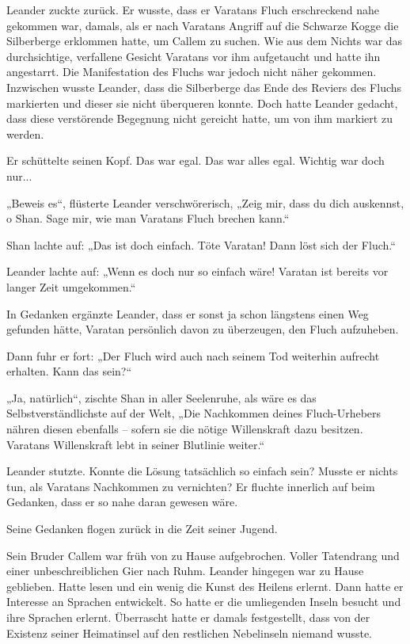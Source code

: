 \documentclass[10pt, a4paper, oneside]{book}
\begin{document}
Leander zuckte zurück. Er wusste, dass er Varatans Fluch erschreckend nahe gekommen war, damals, als er nach Varatans Angriff auf die Schwarze Kogge die Silberberge erklommen hatte, um Callem zu suchen. Wie aus dem Nichts war das durchsichtige, verfallene Gesicht Varatans vor ihm aufgetaucht und hatte ihn angestarrt. Die Manifestation des Fluchs war jedoch nicht näher gekommen. Inzwischen wusste Leander, dass die Silberberge das Ende des Reviers des Fluchs markierten und dieser sie nicht überqueren konnte. Doch hatte Leander gedacht, dass diese verstörende Begegnung nicht gereicht hatte, um von ihm markiert zu werden.

Er schüttelte seinen Kopf. Das war egal. Das war alles egal. Wichtig war doch nur...

„Beweis es“, flüsterte Leander verschwörerisch, „Zeig mir, dass du dich auskennst, o Shan. Sage mir, wie man Varatans Fluch brechen kann.“

Shan lachte auf: „Das ist doch einfach. Töte Varatan! Dann löst sich der Fluch.“

Leander lachte auf: „Wenn es doch nur so einfach wäre! Varatan ist bereits vor langer Zeit umgekommen.“

In Gedanken ergänzte Leander, dass er sonst ja schon längstens einen Weg gefunden hätte, Varatan persönlich davon zu überzeugen, den Fluch aufzuheben.

Dann fuhr er fort: „Der Fluch wird auch nach seinem Tod weiterhin aufrecht erhalten. Kann das sein?“

„Ja, natürlich“, zischte Shan in aller Seelenruhe, als wäre es das Selbstverständlichste auf der Welt, „Die Nachkommen deines Fluch-Urhebers nähren diesen ebenfalls – sofern sie die nötige Willenskraft dazu besitzen. Varatans Willenskraft lebt in seiner Blutlinie weiter.“

Leander stutzte. Konnte die Lösung tatsächlich so einfach sein? Musste er nichts tun, als Varatans Nachkommen zu vernichten? Er fluchte innerlich auf beim Gedanken, dass er so nahe daran gewesen wäre.

Seine Gedanken flogen zurück in die Zeit seiner Jugend.

Sein Bruder Callem war früh von zu Hause aufgebrochen. Voller Tatendrang und einer unbeschreiblichen Gier nach Ruhm. Leander hingegen war zu Hause geblieben. Hatte lesen und ein wenig die Kunst des Heilens erlernt. Dann hatte er Interesse an Sprachen entwickelt. So hatte er die umliegenden Inseln besucht und ihre Sprachen erlernt. Überrascht hatte er damals festgestellt, dass von der Existenz seiner Heimatinsel auf den restlichen Nebelinseln niemand wusste.
\end{document}
